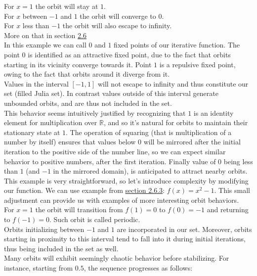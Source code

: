 \documentclass{article}
\begin{document}
For $x=1$ the orbit will stay at $1$. \\
For $x$ between $-1$ and $1$ the orbit will converge to $0$. \\
For $x$ less than $-1$ the orbit will also escape to infinity.
\\
More on that in section \hyperref[equivalent]{2.6}
\\[1\baselineskip]
In this example we can call $0$ and $1$ fixed points of our iterative function. The point $0$ is identified as an attractive fixed point, due to the fact that orbits starting in its vicinity converge towards it. Point $1$ is a repulsive fixed point, owing to the fact that orbits around it diverge from it.
\\[1\baselineskip]
Values in the interval $[-1,1]$ will not escape to infinity and thus constitute our set (filled Julia set). In contrast values outside of this interval generate unbounded orbits, and are thus not included in the set.\\
\pagebreak
This behavior seems intuitively justified by recognizing that $1$ is an identity element for multiplication over $\mathbb{R}$, and so it's natural for orbits to maintain their stationary state at $1$. The operation of squaring (that is multiplication of a number by itself) ensures that values below $0$ will be mirrored after the initial iteration to the positive side of the number line, so we can expect similar behavior to positive numbers, after the first iteration. Finally value of $0$ being less than $1$ (and $-1$ in the mirrored domain), is anticipated to attract nearby orbits.
\\[1\baselineskip]
This example is very straightforward, so let's introduce complexity by modifying our function. We can use example from \hyperref[Example]{section 2.6.3}: $f(x) = x^2 - 1$. This small adjustment can provide us with examples of more interesting orbit behaviors.
\\[1\baselineskip]
For $x=1$ the orbit will transition from $f(1) = 0$ to $f(0) = -1$ and returning to $f(-1) = 0$. Such orbit is called periodic.
\\
Orbits initializing between $-1$ and $1$ are incorporated in our set. Moreover, orbits starting in proximity to this interval tend to fall into it during initial iterations, thus being included in the set as well.
\\
Many orbits will exhibit seemingly chaotic behavior before stabilizing. For instance, starting from $0.5$, the sequence progresses as follows:
\\
\end{document}
